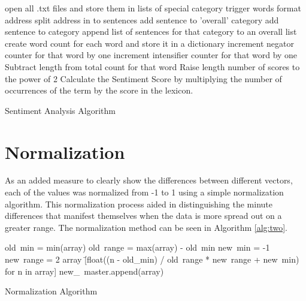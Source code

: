 \begin{singlespace}
\begin{algorithm}[H]
\DontPrintSemicolon
{}
\BlankLine
open all .txt files and store them in lists of special category trigger words\;
	{format address\;
	split address in to sentences\;
		{add sentence to 'overall' category\;
		{add sentence to category}
		{append list of sentences for that category to an overall list}
		{
			{create word count for each word and store it in a dictionary\;
				{increment negator counter for that word by one}
				{increment intensifier counter for that word by one}
			}
		{
		{
		{Subtract length from total count for that word}
		}
		{Raise length number of scores to the power of 2}
		Calculate the Sentiment Score by multiplying the number of occurrences of the term by the score in the lexicon.
		}
		}
	}
	}
	
\caption{Sentiment Analysis Algorithm}
\label{alg:classification}
\end{algorithm}
\end{singlespace}

\section{Normalization}
As an added measure to clearly show the differences between different vectors, each of the values was normalized from -1 to 1 using a simple normalization algorithm.
This normalization process aided in distinguishing the minute differences that manifest themselves when the data is more spread out on a greater range.
The normalization method can be seen in Algorithm \ref{alg:two}.

\begin{singlespace}
\begin{algorithm}[H]
\DontPrintSemicolon
{}
\BlankLine
{}
	{old\ min = min(array)\;
	old\ range = max(array) - old\ min\;
    	new\ min = -1\;
   	new\ range = 2\;
    	array \= [float((n - old\_min) / old\ range * new\ range + new\ min) for n in array]\;
	new\_\ master.append(array)}
\caption{Normalization Algorithm}
\label{alg:two}
\end{algorithm}
\end{singlespace}

